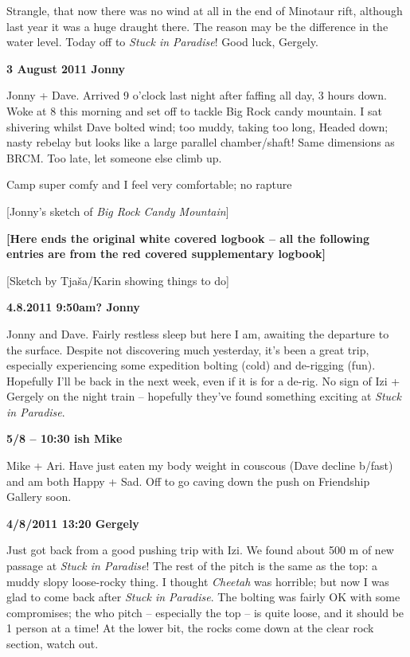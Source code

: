Strangle, that now there was no wind at all in the end of Minotaur rift,
although last year it was a huge draught there. The reason may be the
difference in the water level. Today off to \emph{Stuck in Paradise}!
Good luck, Gergely.

\textbf{3 August 2011 Jonny}

Jonny + Dave. Arrived 9 o'clock last night after faffing all day, 3
hours down. Woke at 8 this morning and set off to tackle Big Rock candy
mountain. I sat shivering whilst Dave bolted wind; too muddy, taking too
long, Headed down; nasty rebelay but looks like a large parallel
chamber/shaft! Same dimensions as BRCM. Too late, let someone else climb
up.

Camp super comfy and I feel very comfortable; no rapture

{[}Jonny's sketch of \emph{Big Rock Candy Mountain}{]}

\textbf{{[}Here ends the original white covered logbook -- all the
following entries are from the red covered supplementary logbook{]}}

{[}Sketch by Tjaša/Karin showing things to do{]}

\textbf{4.8.2011 9:50am? Jonny}

Jonny and Dave. Fairly restless sleep but here I am, awaiting the
departure to the surface. Despite not discovering much yesterday, it's
been a great trip, especially experiencing some expedition bolting
(cold) and de-rigging (fun). Hopefully I'll be back in the next week,
even if it is for a de-rig. No sign of Izi + Gergely on the night train
-- hopefully they've found something exciting at \emph{Stuck in
Paradise}.

\textbf{5/8 -- 10:30 ish Mike}

Mike + Ari. Have just eaten my body weight in couscous (Dave decline
b/fast) and am both Happy + Sad. Off to go caving down the push on
Friendship Gallery soon.

\textbf{4/8/2011 13:20 Gergely}

Just got back from a good pushing trip with Izi. We found about 500 m of
new passage at \emph{Stuck in Paradise}! The rest of the pitch is the
same as the top: a muddy slopy loose-rocky thing. I thought
\emph{Cheetah} was horrible; but now I was glad to come back after
\emph{Stuck in Paradise}. The bolting was fairly OK with some
compromises; the who pitch -- especially the top -- is quite loose, and
it should be 1 person at a time! At the lower bit, the rocks come down
at the clear rock section, watch out.

